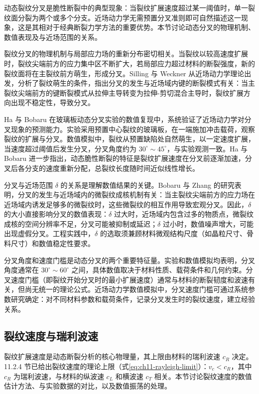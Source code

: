 动态裂纹分叉是脆性断裂中的典型现象：当裂纹扩展速度超过某一阈值时，单一裂纹面分裂为两个或多个分支。近场动力学无需预置分叉准则即可自然描述这一现象，这是其相对于经典断裂力学方法的重要优势。本节讨论动态分叉的物理机制、数值表现及与近场范围的关系。

裂纹分叉的物理机制与局部应力场的重新分布密切相关。当裂纹以较高速度扩展时，裂纹尖端前方的应力集中区不断扩大，若局部应力超过材料的断裂强度，新的裂纹面将在主裂纹前方萌生，形成分叉。Silling 与 Weckner \cite{SillingWeckner2010} 从近场动力学理论出发，分析了裂纹萌生的条件，指出分叉的发生与近场域内键的断裂模式有关：当主裂纹尖端前方的键断裂模式从拉伸主导转变为拉伸-剪切混合主导时，裂纹扩展方向出现不稳定性，导致分叉。

Ha 与 Bobaru \cite{HaBobaru2010} 在玻璃板动态分叉实验的数值复现中，系统验证了近场动力学对分叉现象的预测能力。实验采用预置中心裂纹的玻璃板，在一端施加冲击载荷，观察裂纹的扩展与分叉。数值模拟中，裂纹从预置缺陷处自然萌生，以一定速度扩展，当速度超过阈值后发生分叉，分叉角度约为 $30^{\circ}\sim 45^{\circ}$，与实验观测一致。Ha 与 Bobaru \cite{HaBobaru2011} 进一步指出，动态脆性断裂的特征是裂纹扩展速度在分叉前逐渐加速，分叉后各分支的速度重新分配，总裂纹长度随时间近似线性增长。

分叉与近场范围 $\delta$ 的关系是理解数值结果的关键。Bobaru 与 Zhang \cite{BobaruZhang2015} 的研究表明，分叉的发生与近场域内的微裂纹成核机制有关：当主裂纹尖端前方的应力场在近场域内诱发足够多的微裂纹时，这些微裂纹的相互作用导致宏观分叉。因此，$\delta$ 的大小直接影响分叉的数值表现：$\delta$ 过大时，近场域内包含过多的物质点，微裂纹成核的空间分辨率不足，分叉可能被抑制或延迟；$\delta$ 过小时，数值噪声增大，可能出现虚假分叉。工程实践中，$\delta$ 的选取须兼顾材料微观结构尺度（如晶粒尺寸、骨料尺寸）和数值稳定性要求。

分叉角度和速度门槛是动态分叉的两个重要特征量。实验和数值模拟均表明，分叉角度通常在 $30^{\circ}\sim 60^{\circ}$ 之间，具体数值取决于材料性质、载荷条件和几何约束。分叉速度门槛（即裂纹开始分叉时的最小扩展速度）通常与材料的断裂韧度和波速有关，但尚无统一的理论公式。近场动力学数值模拟中，分叉速度门槛可通过系统参数研究确定：对不同材料参数和载荷条件，记录分叉发生时的裂纹速度，建立经验关系。

\subsection{裂纹速度与瑞利波速}\label{sec:ch11-crack-velocity}

裂纹扩展速度是动态断裂分析的核心物理量，其上限由材料的瑞利波速 $c_R$ 决定。11.2.4 节已给出裂纹速度的理论上限（式\eqref{eq:ch11-rayleigh-limit}）：$v_c<c_R$，其中 $c_R$ 为瑞利波速，与材料的纵波速 $c_L$ 和横波速 $c_T$ 相关。本节讨论裂纹速度的数值估计方法、与实验数据的对比，以及数值振荡的处理。

